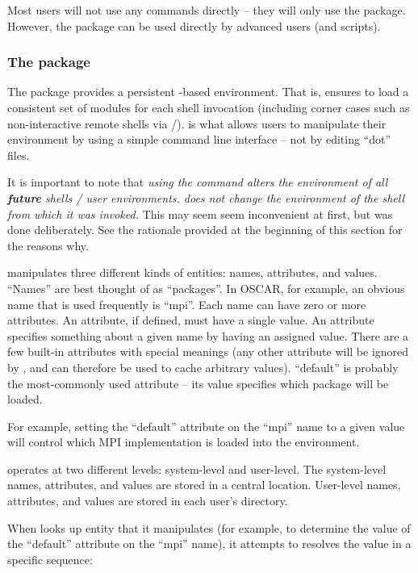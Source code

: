 Most users will not use any  commands directly -- they
will only use the  package.  However, the
 package can be used directly by advanced users (and
scripts).

\subsubsection{The  package}

The  package provides a persistent
-based environment.  That is,  ensures
to load a consistent set of modules for each shell invocation
(including corner cases such as non-interactive remote shells via
/).   is what allows users to
manipulate their environment by using a simple command line interface
-- not by editing ``dot'' files.

It is important to note that {\em using the  command
  alters the environment of all {\bf future} shells / user
  environments.   does not change the environment of the
  shell from which it was invoked.}  This may seem seem inconvenient
at first, but was done deliberately.  See the rationale provided at
the beginning of this section for the reasons why.

 manipulates three different kinds of entities:
names, attributes, and values.  ``Names'' are best thought of as
``packages''.  In OSCAR, for example, an obvious name that is used
frequently is ``mpi''.  Each name can have zero or more attributes.
An attribute, if defined, must have a single value.  An attribute
specifies something about a given name by having an assigned value.
There are a few built-in attributes with special meanings (any other
attribute will be ignored by , and can therefore be
used to cache arbitrary values).  ``default'' is probably the
most-commonly used attribute -- its value specifies which package will
be loaded.

For example, setting the ``default'' attribute on the ``mpi'' name to
a given value will control which MPI implementation is loaded into the
environment.

 operates at two different levels: system-level and
user-level.  The system-level names, attributes, and values are stored
in a central location.  User-level names, attributes, and values are
stored in each user's  directory.

When  looks up entity that it manipulates (for
example, to determine the value of the ``default'' attribute on the
``mpi'' name), it attempts to resolves the value in a specific
sequence:

